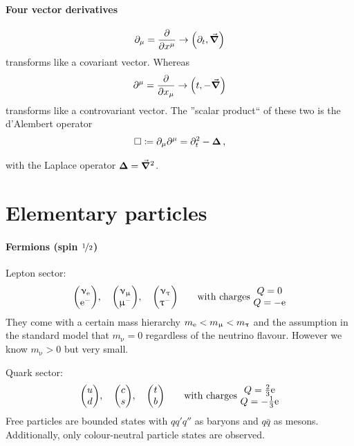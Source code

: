 \paragraph{Four vector derivatives}
\begin{align}
    \partial_\mu = \pdv{x^\mu} \rightarrow \qty( \partial_t, \vec \grad )
\end{align}
transforms like a covariant vector. Whereas
\begin{align}
    \partial^\mu = \pdv{x_\mu} \rightarrow \qty(t, - \vec \grad)
\end{align}
transforms like a controvariant vector. The ''scalar product`` of these two is the d'Alembert operator
\begin{align}
    \Box \coloneqq \partial_\mu\partial^\mu = \partial_t^2 - \bm{\Delta}\,,
\end{align}
\begin{compactitem}
    \item[with] the Laplace operator $\bm{\Delta} = \vec \grad^2$.
\end{compactitem}

\section{Elementary particles}
\paragraph{Fermions (spin $\nicefrac 12$)} Lepton sector:
\begin{align}
    \mqty(\upnu_\mr{e} \\\mr e^- ), \quad \mqty(\upnu_\upmu \\ \upmu^-),\quad \mqty(\upnu_\uptau \\ \uptau^-) \qquad \text{with charges } \mqty{Q = 0 \\ Q= -\mr e}
\end{align}
They come with a certain mass hierarchy $m_{\mathrm{e}} < m_\upmu < m_\uptau$ and the assumption in the standard model that $m_\upnu = 0$ regardless of the neutrino flavour. However we know $m_\upnu >0$ but very small.

Quark sector:
\begin{align}
    \mqty(u \\ d), \quad \mqty(c \\ s), \quad \mqty( t \\ b) \qquad \text{with charges } \mqty{Q = \frac 23 \mr e \\ Q = - \frac 13 \mr e}
\end{align}
Free particles are bounded states with $qq'q''$ as baryons and $q\bar q$ as mesons. Additionally, only colour-neutral particle states are observed.

